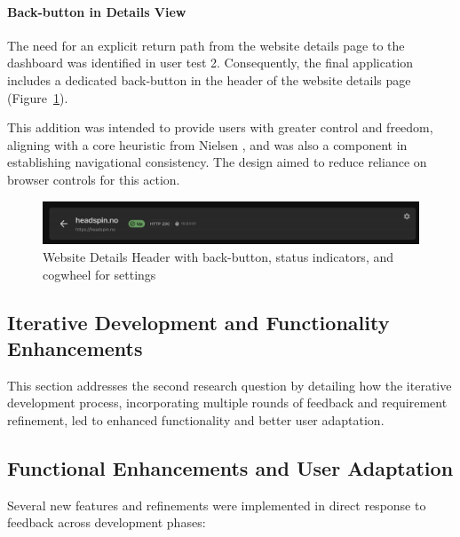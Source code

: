 {\paragraph{Back-button in Details View}
The need for an explicit return path from the website details page to the dashboard was identified in user test 2. Consequently, the final application includes a dedicated back-button in the header of the website details page (Figure~\ref{fig:header_websitedetails}).

This addition was intended to provide users with greater control and freedom, aligning with a core heuristic from Nielsen \parencite{nielsen1994}, and was also a component in establishing navigational consistency. The design aimed to reduce reliance on browser controls for this action.

\begin{figure}[H]
    \centering
    \includegraphics[width=1\linewidth]{figures/header_websiteDetails.png}
    \caption{Website Details Header with back-button, status indicators, and cogwheel for settings}
    \label{fig:header_websitedetails}
\end{figure}


\subsection{Iterative Development and Functionality Enhancements}
\label{sec:rq2}
This section addresses the second research question by detailing how the iterative development process, incorporating multiple rounds of feedback and requirement refinement, led to enhanced functionality and better user adaptation.



\subsection{Functional Enhancements and User Adaptation}
Several new features and refinements were implemented in direct response to feedback across development phases:

}
